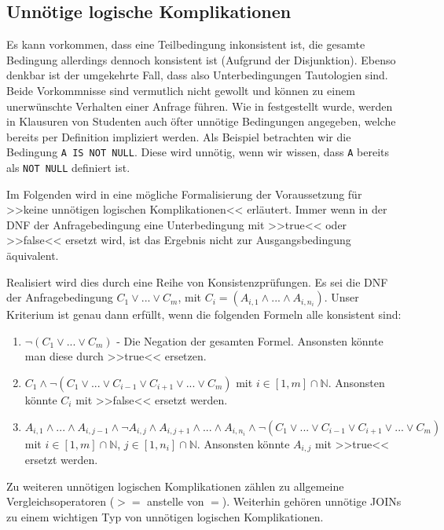 \subsection{Unnötige logische Komplikationen}

Es kann vorkommen, dass eine Teilbedingung inkonsistent ist, die gesamte Bedingung allerdings dennoch konsistent ist (Aufgrund der Disjunktion). Ebenso denkbar ist der umgekehrte Fall, dass also Unterbedingungen Tautologien sind. Beide Vorkommnisse sind vermutlich nicht gewollt und können zu einem unerwünschte Verhalten einer Anfrage führen. Wie in \cite{brass2} festgestellt wurde, werden in Klausuren von Studenten auch öfter unnötige Bedingungen angegeben, welche bereits per Definition impliziert werden. Als Beispiel betrachten wir die Bedingung \verb|A IS NOT NULL|. Diese wird unnötig, wenn wir wissen, dass \verb|A| bereits als \verb|NOT NULL| definiert ist.

Im Folgenden wird in \cite{brass2} eine mögliche Formalisierung der Voraussetzung für >>keine unnötigen logischen Komplikationen<< erläutert. Immer wenn in der DNF der Anfragebedingung eine Unterbedingung mit >>true<< oder >>false<< ersetzt wird, ist das Ergebnis nicht zur Ausgangsbedingung äquivalent.

Realisiert wird dies durch eine Reihe von Konsistenzprüfungen. Es sei die DNF der Anfragebedingung $C_1\vee ...\vee C_m$, mit $C_i=(A_{i,1}\wedge ...\wedge A_{i,n_i})$. Unser Kriterium ist genau dann erfüllt, wenn die folgenden Formeln alle konsistent sind:

\begin{enumerate}
\item $\neg(C_1 \vee ... \vee C_m)$ - Die Negation der gesamten Formel. Ansonsten könnte man diese durch >>true<< ersetzen.
\item $C_1 \wedge \neg(C_1 \vee ... \vee C_{i-1} \vee C_{i+1} \vee ... \vee C_m)$ mit $i\in [1,m]\cap \mathbb{N}$. Ansonsten könnte $C_i$ mit >>false<< ersetzt werden.
\item  $A_{i,1} \wedge ... \wedge A_{i,j-1} \wedge  \neg A_{i,j} \wedge A_{i,j+1} \wedge ... \wedge A_{i,n_i} \wedge \neg(C_1 \vee ... \vee C_{i-1} \vee C_{i+1} \vee ... \vee C_m)$ mit $i\in [1,m] \cap \mathbb{N}$, $j\in [1,n_i]\cap \mathbb{N}$. Ansonsten könnte $A_{i,j}$ mit >>true<< ersetzt werden.
\end{enumerate}

Zu weiteren unnötigen logischen Komplikationen zählen zu allgemeine Vergleichsoperatoren ($>=$ anstelle von $=$). Weiterhin gehören unnötige JOINs zu einem wichtigen Typ von unnötigen logischen Komplikationen.

